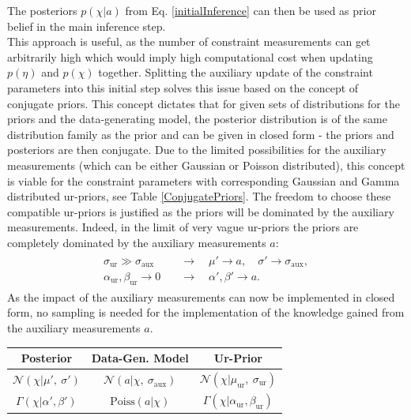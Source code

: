 \noindent The posteriors $p(\chi \vert a)$ from Eq. \eqref{initialInference} can then be used as prior belief in the main inference step. \\
This approach is useful, as the number of constraint measurements can get arbitrarily high which would imply high computational cost when updating $p(\eta)$ and $p(\chi)$ together. Splitting the auxiliary update of the constraint parameters into this initial step solves this issue based on the concept of conjugate priors. This concept dictates that for given sets of distributions for the priors and the data-generating model, the posterior distribution is of the same distribution family as the prior and can be given in closed form - the priors and posteriors are then conjugate. Due to the limited possibilities for the auxiliary measurements (which can be either Gaussian or Poisson distributed), this concept is viable for the constraint parameters with corresponding Gaussian and Gamma distributed ur-priors, see Table \ref{ConjugatePriors}\cite{ConjPriorsBerkeley}. The freedom to choose these compatible ur-priors is justified as the priors will be dominated by the auxiliary measurements. Indeed, in the limit of very vague ur-priors the priors are completely dominated by the auxiliary measurements $a$:
    \begin{align}
    \begin{split}
        \sigma_{\text{ur}} \gg \sigma_{\text{aux}} \quad &\longrightarrow \quad  \mu' \rightarrow a, \quad \sigma' \rightarrow \sigma_{\text{aux}}, \\
        \alpha_{\text{ur}}, \beta_{\text{ur}} \rightarrow 0 \quad &\longrightarrow \quad \alpha', \beta' \rightarrow a.
    \end{split}
    \end{align}
As the impact of the auxiliary measurements can now be implemented in closed form, no sampling is needed for the implementation of the knowledge gained from the auxiliary measurements $a$.

    \begin{center}
        \begin{tabular}
        {| c || c | c|}
         \hline
          Posterior & Data-Gen. Model & Ur-Prior \\
         \hline
         \hline
         $\mathcal{N}\left( \chi | \mu',~\sigma'\right)$ &$ \mathcal{N}\left( a | \chi,~\sigma_{\text{aux}}\right)$ & $\mathcal{N}\left( \chi | \mu_{\text{ur}},~\sigma_{\text{ur}}\right)$ \\
        \hline
        $\Gamma\left(\chi |\alpha', \beta'\right)$ & $\text{Poiss}\left( a | \chi \right)$ & $\Gamma\left(\chi |\alpha_{\text{ur}}, \beta_{\text{ur}} \right)$ \\
        \hline
        \end{tabular}
    \end{center}

